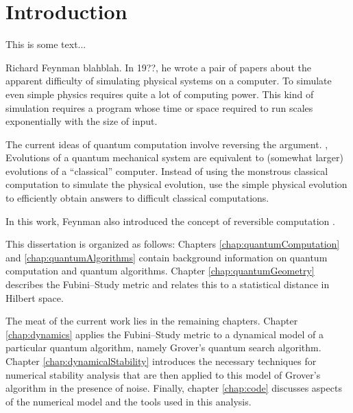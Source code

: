 


\chapter{Introduction}
\label{chap:introduction}
%

This is some text...

Richard Feynman blahblah.
In 19??, he wrote a pair of papers about the apparent 
difficulty of simulating physical systems on a computer.  
To simulate even simple physics requires quite a lot
of computing power.
This kind of simulation requires a program whose time
or space required to run scales exponentially with the
size of input.

The current ideas of quantum computation involve reversing
the argument. \ie, Evolutions of a quantum mechanical 
system are equivalent to (somewhat larger) evolutions of a
``classical'' computer.  Instead of using the monstrous 
classical computation to simulate the physical evolution,
use the simple physical evolution to efficiently obtain 
answers to difficult classical computations.

In this work, Feynman also introduced the concept of reversible 
computation .  



This dissertation is organized as follows:  Chapters \ref{chap:quantumComputation}
and \ref{chap:quantumAlgorithms} contain background information on quantum computation
and quantum algorithms.
Chapter \ref{chap:quantumGeometry} describes the
Fubini--Study metric and relates this to a statistical distance in Hilbert space.

The meat of the current work lies in the remaining chapters.  
Chapter \ref{chap:dynamics} applies the Fubini--Study  metric to a dynamical 
model of a particular quantum algorithm, namely Grover's quantum search algorithm.  
Chapter \ref{chap:dynamicalStability} introduces the
necessary techniques for numerical stability analysis that are then applied to
this model of Grover's algorithm in the presence of noise. 
Finally, chapter \ref{chap:code} discusses aspects of the numerical model and the 
tools used in this analysis. 


